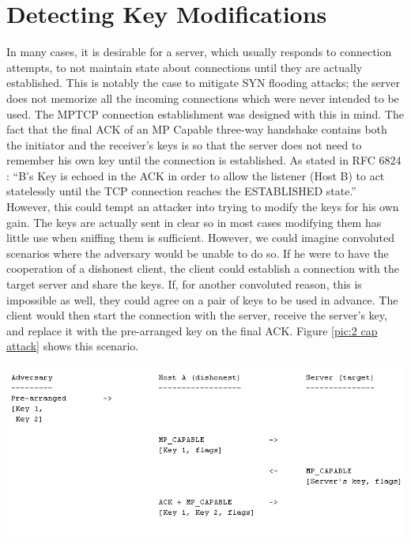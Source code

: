 \section{Detecting Key Modifications}
In many cases, it is desirable for a server, which usually responds to connection attempts, to not maintain state about connections until they are actually established. This is notably the case to mitigate SYN flooding attacks; the server does not memorize all the incoming connections which were never intended to be used. The MPTCP connection establishment was designed with this in mind. The fact that the final ACK of an MP Capable three-way handshake contains both the initiator and the receiver's keys is so that the server does not need to remember his own key until the connection is established. As stated in RFC 6824 \cite{rfc6824}: ``B's Key is echoed in the ACK in order to allow the listener (Host B) to act statelessly until the TCP connection reaches the ESTABLISHED state.'' \\

However, this could tempt an attacker into trying to modify the keys for his own gain. The keys are actually sent in clear so in most cases modifying them has little use when sniffing them is sufficient. However, we could imagine convoluted scenarios where the adversary would be unable to do so. If he were to have the cooperation of a dishonest client, the client could establish a connection with the target server and share the keys. If, for another convoluted reason, this is impossible as well, they could agree on a pair of keys to be used in advance. The client would then start the connection with the server, receive the server's key, and replace it with the pre-arranged key on the final ACK. Figure \ref{pic:2 cap attack} shows this scenario. \\

\begin{minipage}[c]{\textwidth}
\centering
\includegraphics[scale = 0.6]{Figures/mpcapattack.png}
\label{pic:2 cap attack}
\end{minipage} \\ 
%

